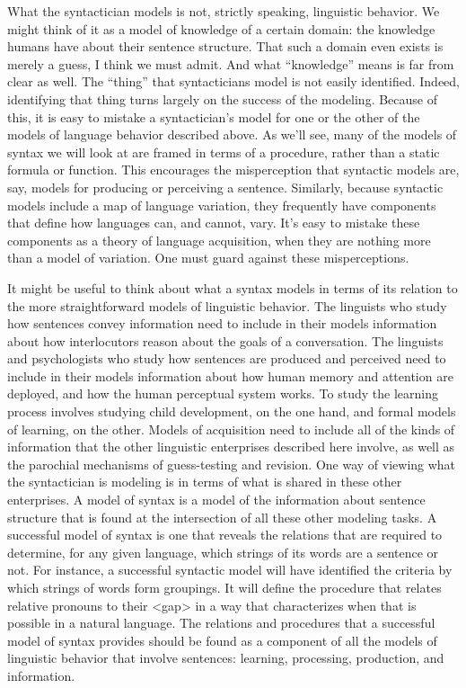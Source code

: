 {What the syntactician models is not, strictly speaking, linguistic behavior. We might think of it as a model of knowledge of a certain domain: the knowledge humans have about their sentence structure. That such a domain even exists is merely a guess, I think we must admit. And what ``knowledge'' means is far from clear as well. The ``thing'' that syntacticians model is not easily identified. Indeed, identifying that thing turns largely on the success of the modeling. Because of this, it is easy to mistake a syntactician's model for one or the other of the models of language behavior described above. As we'll see, many of the models of syntax we will look at are framed in terms of a procedure, rather than a static formula or function. This encourages the misperception that syntactic models are, say, models for producing or perceiving a sentence. Similarly, because syntactic models include a map of language variation, they frequently have components that define how languages can, and cannot, vary. It's easy to mistake these components as a theory of language acquisition, when they are nothing more than a model of variation. One must guard against these misperceptions.

It might be useful to think about what a syntax models in terms of its relation to the more straightforward models of linguistic behavior. The linguists who study how sentences convey information need to include in their models information about how interlocutors reason about the goals of a conversation. The linguists and psychologists who study how sentences are produced and perceived need to include in their models information about how human memory and attention are deployed, and how the human perceptual system works. To study the learning process involves studying child development, on the one hand, and formal models of learning, on the other. Models of acquisition need to include all of the kinds of information that the other linguistic enterprises described here involve, as well as the parochial mechanisms of guess-testing and revision. One way of viewing what the syntactician is modeling is in terms of what is shared in these other enterprises. A model of syntax is a model of the information about sentence structure that is found at the intersection of all these other modeling tasks. A successful model of syntax is one that reveals the relations that are required to determine, for any given language, which strings of its words are a sentence or not. For instance, a successful syntactic model will have identified the criteria by which strings of words form groupings. It will define the procedure that relates relative pronouns to their <gap> in a way that characterizes when that is possible in a natural language. The relations and procedures that a successful model of syntax provides should be found as a component of all the models of linguistic behavior that involve sentences: learning, processing, production, and information.

}
